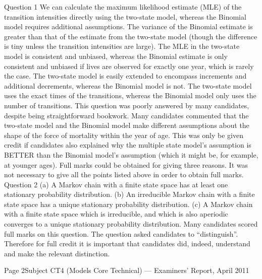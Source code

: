 \documentclass[a4paper,12pt]{article}
\begin{document}
\begin{enumerate}
Question 1
We can calculate the maximum likelihood estimate (MLE) of the transition intensities directly using the two-state model, whereas the Binomial model requires additional
assumptions.
The variance of the Binomial estimate is greater than that of the estimate from the two-state model (though the difference is tiny unless the transition intensities are large).
The MLE in the two-state model is consistent and unbiased, whereas the Binomial estimate is only consistent and unbiased if lives are observed for exactly one year, which is rarely the
case.
The two-state model is easily extended to encompass increments and additional decrements, whereas the Binomial model is not.
The two-state model uses the exact times of the transitions, whereas the Binomial model only uses the number of transitions.
This question was poorly answered by many candidates, despite being straightforward bookwork. Many candidates commented that the two-state model and the Binomial model
make different assumptions about the shape of the force of mortality within the year of age.
This was only be given credit if candidates also explained why the multiple state model’s assumption is BETTER than the Binomial model’s assumption (which it might be, for
example, at younger ages).
Full marks could be obtained for giving three reasons. It was not necessary to give all the
points listed above in order to obtain full marks.
Question 2
(a) A Markov chain with a finite state space has at least one stationary probability
distribution.
(b) An irreducible Markov chain with a finite state space has a unique stationary probability distribution.
(c) A Markov chain with a finite state space which is irreducible, and which is also aperiodic converges to a unique stationary probability distribution.
Many candidates scored full marks on this question. The question asked candidates to “distinguish”. Therefore for full credit it is important that candidates did, indeed,
understand and make the relevant distinction.

Page 2Subject CT4 (Models Core Technical) — Examiners’ Report, April 2011

\newpage


\end{enumerate}
\end{document}
